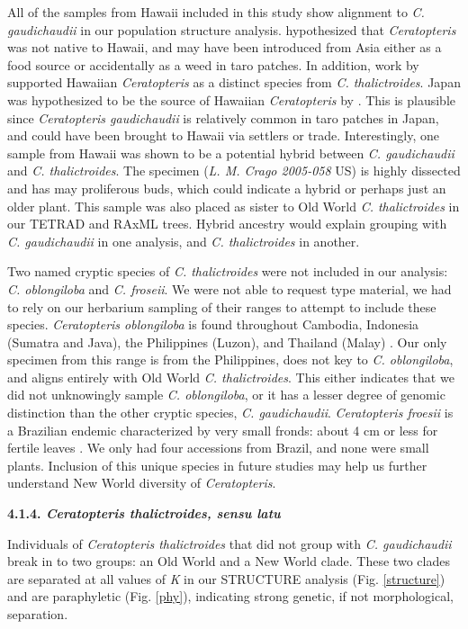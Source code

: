 \documentclass[12pt]{article}
\begin{document}
\begin{flushleft}
All of the samples from Hawaii included in this study show alignment to \textit{C. gaudichaudii} in our population structure analysis. \textcite{Wagner1950} hypothesized that \textit{Ceratopteris} was not native to Hawaii, and may have been introduced from Asia either as a food source or accidentally as a weed in taro patches. In addition, work by \textcite{Hickok1979} supported Hawaiian \textit{Ceratopteris} as a distinct species from \textit{C. thalictroides}. Japan was hypothesized to be the source of Hawaiian \textit{Ceratopteris} by \textcite{Lloyd1973}. This is plausible since \textit{Ceratopteris gaudichaudii} is relatively common in taro patches in Japan, and could have been brought to Hawaii via settlers or trade. Interestingly, one sample from Hawaii was shown to be a potential hybrid between \textit{C. gaudichaudii} and \textit{C. thalictroides}. The specimen (\textit{L. M. Crago 2005-058} US) is highly dissected and has may proliferous buds, which could indicate a hybrid or perhaps just an older plant. This sample was also placed as sister to Old World \textit{C. thalictroides} in our TETRAD and RAxML trees. Hybrid ancestry would explain grouping with \textit{C. gaudichaudii} in one analysis, and \textit{C. thalictroides} in another.

Two named cryptic species of \textit{C. thalictroides} were not included in our analysis: \textit{C. oblongiloba} and \textit{C. froseii}. We were not able to request type material, we had to rely on our herbarium sampling of their ranges to attempt to include these species. \textit{Ceratopteris oblongiloba} is found throughout Cambodia, Indonesia (Sumatra and Java), the Philippines (Luzon), and Thailand (Malay) \autocite{Masuyama2010}. Our only specimen from this range is from the Philippines, does not key to \textit{C. oblongiloba}, and aligns entirely with Old World \textit{C. thalictroides}. This either indicates that we did not unknowingly sample \textit{C. oblongiloba}, or it has a lesser degree of genomic distinction than the other cryptic species, \textit{C. gaudichaudii}. \textit{Ceratopteris froesii} is a Brazilian endemic characterized by very small fronds: about 4 cm or less for fertile leaves \autocite{Masuyama2010}. We only had four accessions from Brazil, and none were small plants. Inclusion of this unique species in future studies may help us further understand New World diversity of \textit{Ceratopteris}.

\textbf{4.1.4. \textit{Ceratopteris thalictroides, sensu latu}}

Individuals of \textit{Ceratopteris thalictroides} that did not group with \textit{C. gaudichaudii} break in to two groups: an Old World and a New World clade. These two clades are separated at all values of \textit{K} in our {\small{STRUCTURE}} analysis (Fig. \ref{structure}) and are paraphyletic (Fig. \ref{phy}), indicating strong genetic, if not morphological, separation.


\end{flushleft}
\end{document}
